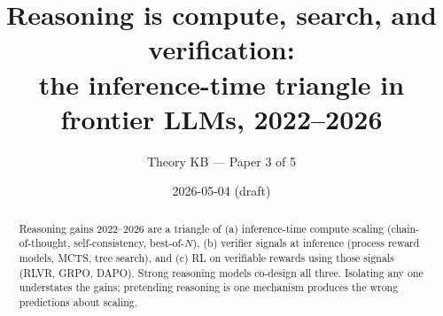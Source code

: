 








\title{
  Reasoning is compute, search, and verification: \\
  the inference-time triangle in frontier LLMs, 2022--2026
}
\author{Theory KB --- Paper 3 of 5}
\date{2026-05-04 (draft)}


\maketitle

\begin{abstract}
Reasoning gains 2022--2026 are a triangle of (a) inference-time compute
scaling (chain-of-thought, self-consistency, best-of-$N$), (b) verifier
signals at inference (process reward models, MCTS, tree search), and
(c) RL on verifiable rewards using those signals (RLVR, GRPO, DAPO).
Strong reasoning models co-design all three. Isolating any one
understates the gains; pretending reasoning is one mechanism produces
the wrong predictions about scaling.
\end{abstract}

\tableofcontents




















